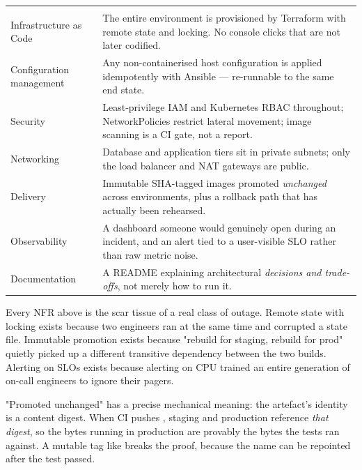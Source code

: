 \begin{center}\small
\wbrowcolors
\begin{tabularx}{\linewidth}{@{}L{34mm} X@{}}
 & \\
Infrastructure as Code & The entire environment is provisioned by Terraform with remote state and locking. No console clicks that are not later codified.\\
Configuration management & Any non-containerised host configuration is applied idempotently with Ansible --- re-runnable to the same end state.\\
Security & Least-privilege IAM and Kubernetes RBAC throughout; NetworkPolicies restrict lateral movement; image scanning is a CI gate, not a report.\\
Networking & Database and application tiers sit in private subnets; only the load balancer and NAT gateways are public.\\
Delivery & Immutable SHA-tagged images promoted \emph{unchanged} across environments, plus a rollback path that has actually been rehearsed.\\
Observability & A dashboard someone would genuinely open during an incident, and an alert tied to a user-visible SLO rather than raw metric noise.\\
Documentation & A README explaining architectural \emph{decisions and trade-offs}, not merely how to run it.\\
\end{tabularx}
\end{center}

 Every NFR above is the scar tissue of a real class of outage. Remote state with locking exists because two engineers ran  at the same time and corrupted a state file. Immutable promotion exists because "rebuild for staging, rebuild for prod" quietly picked up a different transitive dependency between the two builds. Alerting on SLOs exists because alerting on CPU trained an entire generation of on-call engineers to ignore their pagers.

 "Promoted unchanged" has a precise mechanical meaning: the artefact's identity is a content digest. When CI pushes , staging and production reference \emph{that digest}, so the bytes running in production are provably the bytes the tests ran against. A mutable tag like  breaks the proof, because the name can be repointed after the test passed.

